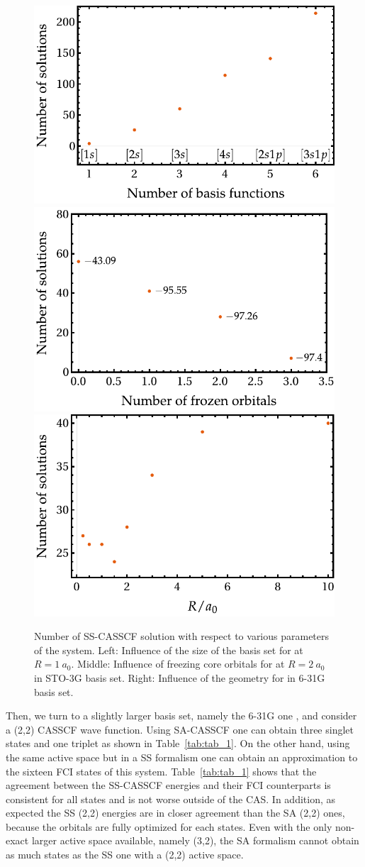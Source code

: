 \documentclass[aps,prb,reprint,showkeys,superscriptaddress]{revtex4-1}
\begin{document}
\begin{figure}
  \includegraphics[width=0.3\linewidth]{Figures/fig_2a.pdf}
  \hspace{0.03\linewidth}
  \includegraphics[width=0.3\linewidth]{Figures/fig_2b.pdf}
  \hspace{0.03\linewidth}
  \includegraphics[width=0.3\linewidth]{Figures/fig_2c.pdf}
  \caption{Number of SS-CASSCF solution with respect to various parameters of the system. Left: Influence of the size of the basis set for  at $R=1~a_0$. Middle: Influence of freezing core orbitals for  at $R=2~a_0$ in STO-3G basis set. Right: Influence of the geometry for  in 6-31G basis set.
    \label{fig:fig_2}}
\end{figure}

Then, we turn to a slightly larger basis set, namely the 6-31G one \cite{Ditchfield_1971}, and consider a (2,2) CASSCF wave function.
Using SA-CASSCF one can obtain three singlet states and one triplet as shown in Table~\ref{tab:tab_1}.
On the other hand, using the same active space but in a SS formalism one can obtain an approximation to the sixteen FCI states of this system.
Table~\ref{tab:tab_1} shows that the agreement between the SS-CASSCF energies and their FCI counterparts is consistent for all states and is not worse outside of the CAS.
In addition, as expected the SS (2,2) energies are in closer agreement than the SA (2,2) ones, because the orbitals are fully optimized for each states.
Even with the only non-exact larger active space available, namely (3,2), the SA formalism cannot obtain as much states as the SS one with a (2,2) active space.
\end{document}
